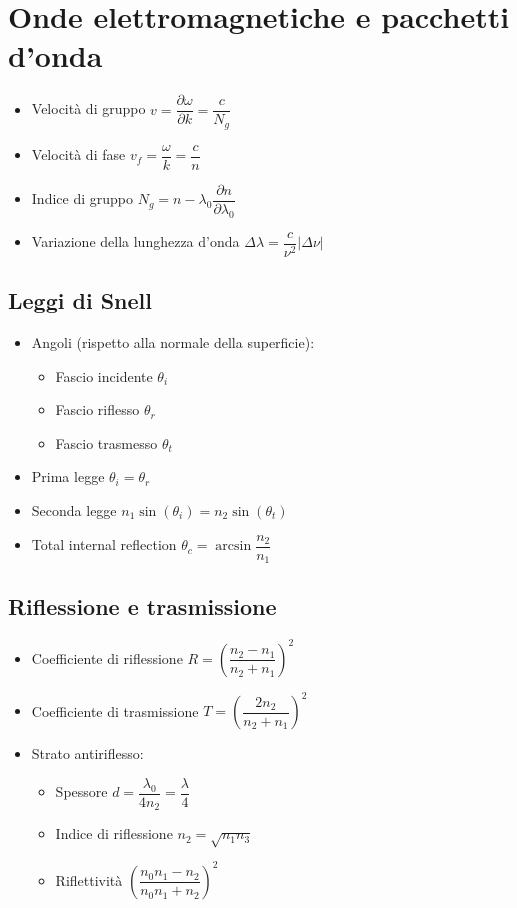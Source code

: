 \documentclass{article}
\begin{document}
\section{Onde elettromagnetiche e pacchetti d'onda}
\begin{itemize}
\item Velocità di gruppo \( v = \dfrac{\partial \omega}{\partial k} = \dfrac{c}{N_g} \)
\item Velocità di fase \( v_f = \dfrac{\omega}{k} = \dfrac{c}{n}  \)
\item Indice di gruppo \( N_g = n - \lambda_0 \dfrac{\partial n}{\partial \lambda_0} \)
\item Variazione della lunghezza d'onda \( \Delta \lambda = \dfrac{c}{\nu^2} | \Delta \nu | \)
\end {itemize}

\subsection{Leggi di Snell}
\begin{itemize}
  \item Angoli (rispetto alla normale della superficie):
        \begin{itemize}
          \item Fascio incidente \( \theta_i \)
          \item Fascio riflesso  \( \theta_r \)
          \item Fascio trasmesso \( \theta_t \)
        \end{itemize}
  \item Prima legge \( \theta_i = \theta_r \)
  \item Seconda legge \( n_1 \sin(\theta_i) = n_2 \sin(\theta_t) \)
  \item Total internal reflection \( \theta_c = \arcsin\dfrac{n_2}{n_1} \)
\end{itemize}

\subsection{Riflessione e trasmissione}
\begin{itemize}
  \item Coefficiente di riflessione \( R = \left( \dfrac{n_2 - n_1}{n_2 + n_1} \right) ^ 2 \)
  \item Coefficiente di trasmissione \( T = \left( \dfrac{2 n_2}{n_2 + n_1} \right) ^ 2 \)
  \item Strato antiriflesso:
        \begin{itemize}
          \item Spessore \( d = \dfrac{\lambda_0}{4 n_2} = \dfrac{\lambda}{4} \)
          \item Indice di riflessione \( n_2 = \sqrt{n_1 n_3} \)
          \item Riflettività \( \left( \dfrac{n_0 n_1 - n_2 }{n_0 n_1 + n_ 2} \right) ^ 2 \)
        \end{itemize}
\end{itemize}
\end{document}
